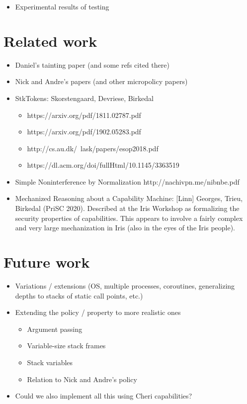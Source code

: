 \documentclass[conference]{IEEEtran}
\newif\iftext \textfalse
\begin{document}
\begin{itemize}
\item Experimental results of testing
\end{itemize}

\section{Related work}

\begin{itemize}
\item Daniel's tainting paper (and some refs cited there)
\item Nick and Andre's papers (and other micropolicy papers)
\item StkTokens: Skorstengaard, Devriese, Birkedal
\begin{itemize}
\item {https://arxiv.org/pdf/1811.02787.pdf}
\item {https://arxiv.org/pdf/1902.05283.pdf}
\item {http://cs.au.dk/~lask/papers/esop2018.pdf}
\item {https://dl.acm.org/doi/fullHtml/10.1145/3363519}
\end{itemize}

\item Simple Noninterference by Normalization {http://nachivpn.me/nibnbe.pdf}

\item Mechanized Reasoning about a Capability Machine: [Linn] Georges,
Trieu, Birkedal (PriSC 2020).
%
Described at the Iris Workshop as formalizing the security properties of
capabilities. This appears to involve a fairly complex and very large
mechanization in Iris (also in the eyes of the Iris people).
\end{itemize}

\iftext
\section{Future work}

\begin{itemize}
\item Variations / extensions (OS, multiple processes, coroutines, generalizing depths to stacks of static call points, etc.)
\item Extending the policy / property to more realistic ones
\begin{itemize}
\item Argument passing
\item Variable-size stack frames
\item Stack variables
\item Relation to Nick and Andre’s policy
\end{itemize}
\item Could we also implement all this using Cheri capabilities?
\end{itemize}
\end{document}
